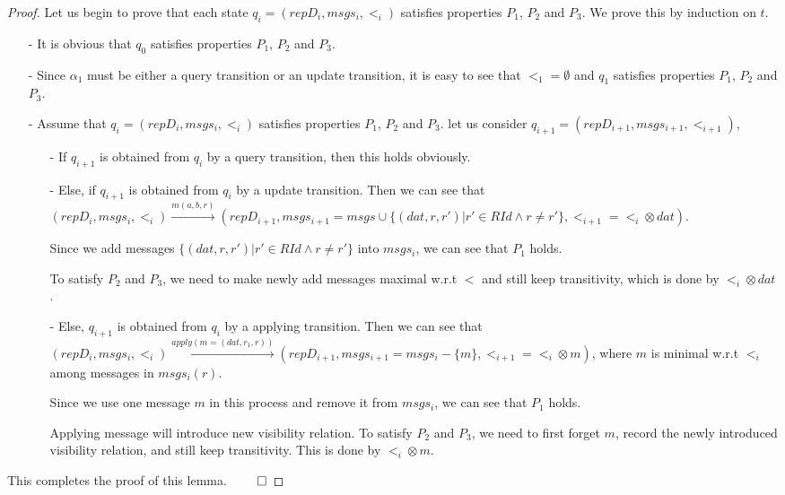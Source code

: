 \begin {proof}
Let us begin to prove that each state $q_i=(repD_i,msgs_i,<_i)$ satisfies properties $P_1$, $P_2$ and $P_3$. We prove this by induction on $t$.

\begin{itemize}
\setlength{\itemsep}{0.5pt}
\item[-] It is obvious that $q_0$ satisfies properties $P_1$, $P_2$ and $P_3$.

\item[-] Since $\alpha_1$ must be either a query transition or an update transition, it is easy to see that $<_1 = \emptyset$ and $q_1$ satisfies properties $P_1$, $P_2$ and $P_3$.

\item[-] Assume that $q_i=(repD_i,msgs_i,<_i)$ satisfies properties $P_1$, $P_2$ and $P_3$. let us consider $q_{i+1}= (repD_{i+1},msgs_{i+1},<_{i+1})$,

    \begin{itemize}
    \setlength{\itemsep}{0.5pt}
    \item[-] If $q_{i+1}$ is obtained from $q_i$ by a query transition, then this holds obviously.

    \item[-] Else, if $q_{i+1}$ is obtained from $q_i$ by a update transition. Then we can see that $(repD_i,msgs_i,<_i) {\xrightarrow{m(a,b,r)}} (repD_{i+1},msgs_{i+1}=msgs \cup \{ (dat,r,r') \vert  r' \in RId \wedge r \neq r' \},<_{i+1} = <_i \otimes dat)$.

        Since we add messages $\{ (dat,r,r') \vert  r' \in RId \wedge r \neq r' \}$ into $msgs_i$, we can see that $P_1$ holds.

        To satisfy $P_2$ and $P_3$, we need to make newly add messages maximal w.r.t $<$ and still keep transitivity, which is done by $<_i \otimes dat$.

    \item[-] Else, $q_{i+1}$ is obtained from $q_i$ by a applying transition. Then we can see that $(repD_i,msgs_i,<_i) {\xrightarrow{apply(m=(dat,r_1,r))}} (repD_{i+1},msgs_{i+1} = msgs_i - \{ m \}, <_{i+1} = <_i \otimes m )$, where $m$ is minimal w.r.t $<_i$ among messages in $msgs_i(r)$.

        Since we use one message $m$ in this process and remove it from $msgs_i$, we can see that $P_1$ holds.

        Applying message will introduce new visibility relation. To satisfy $P_2$ and $P_3$, we need to first forget $m$, record the newly introduced visibility relation, and still keep transitivity. This is done by $<_i \otimes m$.
    \end{itemize}
\end{itemize}

This completes the proof of this lemma. $\qed$
\end {proof}


















